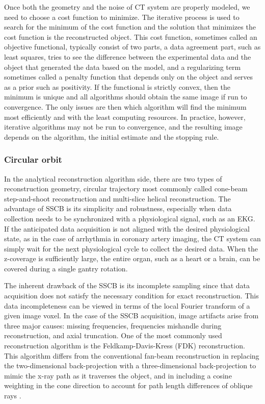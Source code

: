 Once both the geometry and the noise of CT system are properly modeled, we need to choose a cost function to minimize.  The iterative process is used to search for the minimum of the cost function and the solution that minimizes the cost function is the reconstructed object.  This cost function, sometimes called an objective functional, typically consist of two parts, a data agreement part, such as least squares, tries to see the difference between the experimental data and the object that generated the data based on the model, and a regularizing term sometimes called a penalty function that depends only on the object and serves as a prior such as positivity.  If the functional is strictly convex, then the minimum is unique and all algorithms should obtain the same image if run to convergence.  The only issues are then which algorithm will find the minimum most efficiently and with the least computing resources.  In practice, however, iterative algorithms may not be run to convergence, and the resulting image depends on the algorithm, the initial estimate and the stopping rule.

\subsubsection{Circular orbit}
In the analytical reconstruction algorithm side, there are two types of reconstruction geometry, circular trajectory most commonly called cone-beam step-and-shoot reconstruction and multi-slice helical reconstruction.  The advantage of SSCB is its simplicity and robustness, especially when data collection needs to be synchronized with a physiological signal, such as an EKG.  If the anticipated data acquisition is not aligned with the desired physiological state, as in the case of arrhythmia in coronary artery imaging, the CT system can simply wait for the next physiological cycle to collect the desired data.    When the z-coverage is sufficiently large, the entire organ, such as a heart or a brain, can be covered during a single gantry rotation.

The inherent drawback of the SSCB is its incomplete sampling since that data acquisition does not satisfy the necessary condition for exact reconstruction.  This data incompleteness can be viewed in terms of the local Fourier transform of a given image voxel.  In the case of the SSCB acquisition, image artifacts arise from three major causes: missing frequencies, frequencies mishandle during reconstruction, and axial truncation.  
One of the most commonly used reconstruction algorithm is the Feldkamp-Davis-Kress (FDK) reconstruction.  This algorithm differs from the conventional fan-beam reconstruction in replacing the two-dimensional back-projection with a three-dimensional back-projection to mimic the x-ray path as it traverses the object, and in including a cosine weighting in the cone direction to account for path length differences of oblique rays \citep{Feldkamp1984}. 
